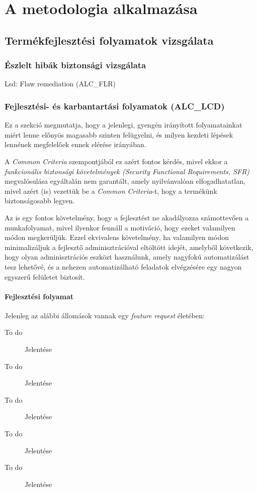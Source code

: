 \chapter{A metodologia alkalmazása}

\section{Termékfejlesztési folyamatok vizsgálata}
\subsection{Észlelt hibák biztonsági vizsgálata}

Lsd: Flaw remediation (ALC\_FLR)

\subsection{Fejlesztési- és karbantartási folyamatok (ALC\_LCD)}
Ez a szekció megmutatja, hogy a jelenlegi, gyengén irányított folyamatainkat miért lenne előnyös
magasabb szinten felügyelni, és milyen kezdeti lépések lennének megfelelőek ennek elérése irányában.

A \emph{Common Criteria} szempontjából ez azért fontos kérdés, mivel ekkor a
\emph{funkcionális biztonsági követelmények (Security Functional Requirements, SFR)} megvalósulása
egyáltalán nem garantált, amely nyilvánvalóan elfogadhatatlan, mivel azért (is) vezettük be a
\emph{Common Criteria}-t, hogy a termékünk biztonságosabb legyen.

Az is egy fontos követelmény, hogy a fejlesztést ne akadályozza számottevően a munkafolyamat, mivel
ilyenkor fennáll a motiváció, hogy ezeket valamilyen módon megkerüljük. Ezzel ekvivalens
követelmény, ha valamilyen módon minimalizáljuk a fejlesztő adminisztrációval eltöltött idejét,
amelyből következik, hogy olyan adminisztrációs eszközt használunk, amely nagyfokú automatizálást
tesz lehetővé, és a nehezen automatizálható feladatok elvégzésére egy nagyon egyszerű felületet
biztosít.

\subsubsection{Fejlesztési folyamat}
Jelenleg az alábbi állomások vannak egy \emph{feature request} életében:
\begin{description}
    \item[To do] {Jelentése}
    \item[To do] {Jelentése}
    \item[To do] {Jelentése}
    \item[To do] {Jelentése}
    \item[To do] {Jelentése}
\end{description}

